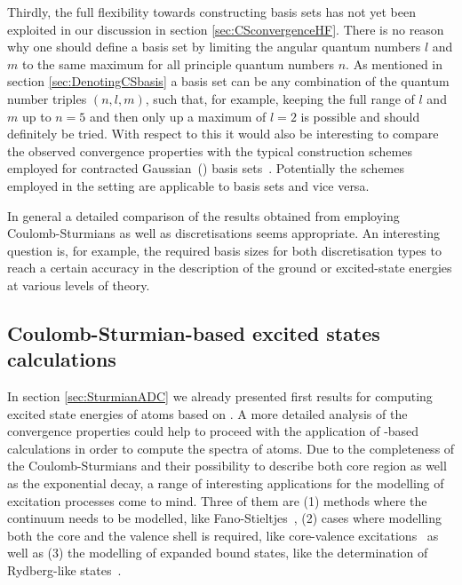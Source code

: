 Thirdly, the full flexibility towards constructing \CS basis sets has not yet
been exploited in our discussion in section \vref{sec:CSconvergenceHF}.
There is no reason why one should define a basis set
by limiting the angular quantum numbers $l$ and $m$ to the same maximum for all
principle quantum numbers $n$.
As mentioned in section \vref{sec:DenotingCSbasis} a \CS basis set can be any
combination of the quantum number triples $(n, l, m)$,
such that, for example, keeping the full range of $l$ and $m$
up to $n=5$ and then only up a maximum of $l=2$ is possible
and should definitely be tried.
With respect to this it would also be interesting to compare the
observed convergence properties with the typical construction schemes
employed for contracted Gaussian~(\cGTO) basis sets~\cite{Jensen2013,Hill2013}.
Potentially the schemes employed in the \cGTO setting are applicable
to \CS basis sets and vice versa.

In general a detailed comparison of the results obtained
from employing Coulomb-Sturmians as well as \cGTO discretisations seems appropriate.
An interesting question is, for example, the required basis sizes for both
discretisation types to reach a certain accuracy
in the description of the ground or excited-state energies
at various levels of theory.

\subsection{Coulomb-Sturmian-based excited states calculations}
\label{sec:SturmianExcited}
In section \vref{sec:SturmianADC} we already presented
first results for computing excited state energies of atoms based on \ADC.
A more detailed analysis of the convergence properties
could help to proceed with the application of \CS-based \ADC
calculations in order to compute the spectra of atoms.
Due to the completeness of the Coulomb-Sturmians
and their possibility to describe both core region as well as
the exponential decay,
a range of interesting applications for the modelling
of excitation processes come to mind.
Three of them are 
(1) methods where the continuum needs to be modelled,
like Fano-Stieltjes~\cite{Feshbach1958,Feshbach1962,Santra2002},
(2) cases where modelling both the core and the valence shell is required,
like core-valence excitations~\cite{Wenzel2014,Wenzel2016}
as well as
(3) the modelling of expanded bound states,
like the determination of Rydberg-like states~\cite{Kaufmann1989,Riss1993}.

